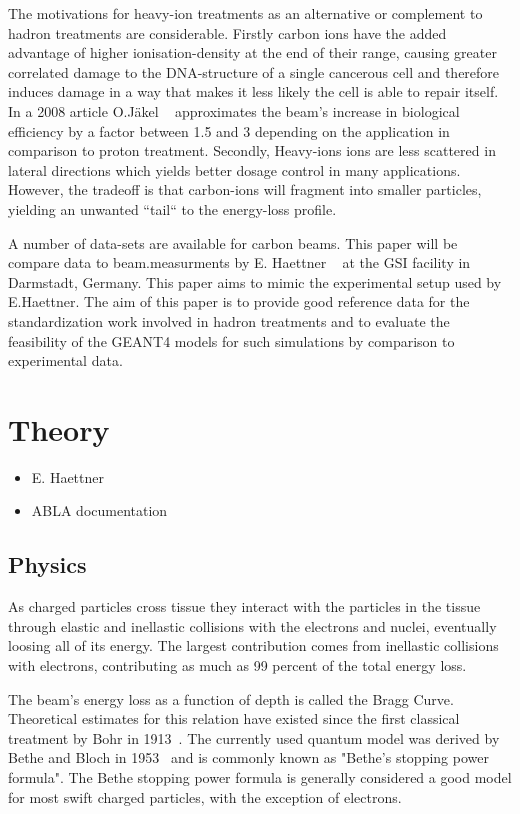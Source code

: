 The motivations for heavy-ion treatments as an alternative or complement to hadron treatments are considerable. Firstly carbon ions have the added advantage of higher ionisation-density at the end of their range, causing greater correlated damage to the DNA-structure of a single cancerous cell and therefore induces damage in a way that makes it less likely the cell is able to repair itself. In a 2008 article O.Jäkel ~\cite{ojakel} approximates the beam's increase in biological efficiency by a factor between 1.5 and 3 depending on the application in comparison to proton treatment. Secondly, Heavy-ions ions are less scattered in lateral directions which yields better dosage control in many applications. However, the tradeoff is that carbon-ions will fragment into smaller particles, yielding an unwanted ``tail`` to the energy-loss profile.

A number of data-sets are available for carbon beams. This paper will be compare data to beam.measurments by E. Haettner ~\cite{ehaettner}  at the GSI facility in Darmstadt, Germany. This paper aims to mimic the experimental setup used by E.Haettner. The aim of this paper is  to provide good reference data for the standardization work involved in hadron treatments and to evaluate the feasibility of the GEANT4 models for such simulations by comparison to experimental data.

\section{Theory}
\begin{itemize}
 \item E. Haettner
 \item ABLA documentation
\end{itemize}
\subsection{Physics}
As charged particles cross tissue they interact with the particles in the tissue through elastic and inellastic collisions with the electrons and nuclei, eventually loosing all of its energy. The largest contribution comes from inellastic collisions with electrons, contributing as much as 99 percent of the total energy loss.

The beam's energy loss as a function of depth is called the Bragg Curve. Theoretical estimates for this relation have existed since the first classical treatment by Bohr in 1913~\cite{bohr13}. The currently used quantum model was derived by Bethe and Bloch in 1953~\cite{bethebloch53}  and is commonly known as "Bethe's stopping power formula". The Bethe stopping power formula is generally considered a good model for most swift charged particles, with the exception of electrons.

